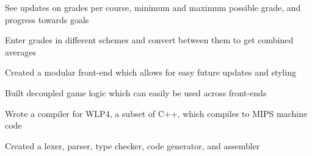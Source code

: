 \documentclass[]{deedy-resume-openfont}
\begin{document}
\begin{minipage}[t]{0.95\textwidth}
\begin{tightemize}
\item See updates on grades per course, minimum and maximum possible grade, and progress towards goals
\item Enter grades in different schemes and convert between them to get combined averages
\end{tightemize}

\begin{tightemize}
\item Created a modular front-end which allows for easy future updates and styling
\item Built decoupled game logic which can easily be used across front-ends
\end{tightemize}

\begin{tightemize}
\item Wrote a compiler for WLP4, a subset of C++, which compiles to MIPS machine code
\item Created a lexer, parser, type checker, code generator, and assembler
\end{tightemize}




\end{minipage}
\end{document}
